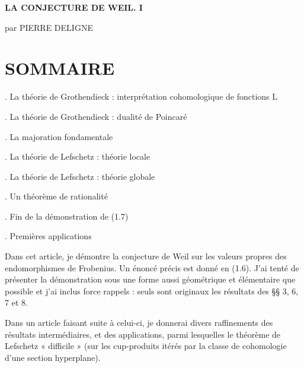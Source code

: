 \documentclass[10pt,leqno]{article}
\begin{document}
\begin{center}{\Large\bfseries LA CONJECTURE DE WEIL. I}\par\medskip par PIERRE DELIGNE\end{center}

\label{physical-2}\par\smallskip

\section*{SOMMAIRE}

. La théorie de Grothendieck : interprétation cohomologique de fonctions \(\mathrm{L}\)\par

. La théorie de Grothendieck : dualité de Poincaré\par

. La majoration fondamentale\par

. La théorie de Lefschetz : théorie locale\par

. La théorie de Lefschetz : théorie globale\par

. Un théorème de rationalité\par

. Fin de la démonstration de (1.7)\par

. Premières applications\par

\noindent Dans cet article, je démontre la conjecture de Weil sur les valeurs propres des endomorphismes de Frobenius. Un énoncé précis est donné en (1.6). J’ai tenté de présenter la démonstration sous une forme aussi géométrique et élémentaire que possible et j’ai inclus force rappels : seuls sont originaux les résultats des §§ 3, 6, 7 et 8.\par

\noindent Dans un article faisant suite à celui-ci, je donnerai divers raffinements des résultats intermédiaires, et des applications, parmi lesquelles le théorème de Lefschetz « difficile » (sur les cup-produits itérés par la classe de cohomologie d’une section hyperplane).\par
\end{document}
